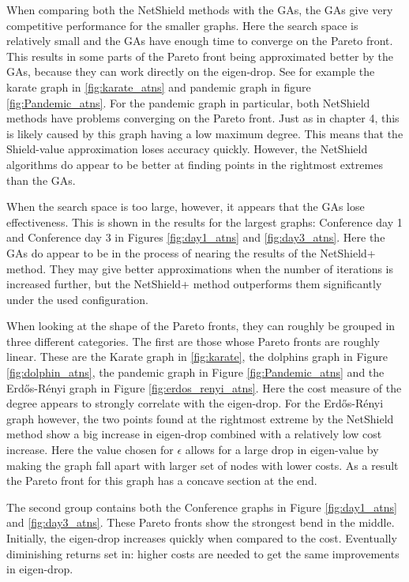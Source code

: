 \documentclass[11pt]{article}
\theoremstyle{definition}
\begin{document}
When comparing both the NetShield methods with the GAs, the GAs give very competitive performance for the smaller graphs. Here the search space is relatively small and the GAs have enough time to converge on the Pareto front. This results in some parts of the Pareto front being approximated better by the GAs, because they can work directly on the eigen-drop. See for example the karate graph in \ref{fig:karate_atns} and pandemic graph in figure \ref{fig:Pandemic_atns}. For the pandemic graph in particular, both NetShield methods have problems converging on the Pareto front. Just as in chapter 4, this is likely caused by this graph having a low maximum degree. This means that the Shield-value approximation loses accuracy quickly. However, the NetShield algorithms do appear to be better at finding points in the rightmost extremes than the GAs. 

When the search space is too large, however, it appears that the GAs lose effectiveness. This is shown in the results for the largest graphs: Conference day 1 and Conference day 3 in Figures \ref{fig:day1_atns} and \ref{fig:day3_atns}. Here the GAs do appear to be in the process of nearing the results of the NetShield+ method. They may give better approximations when the number of iterations is increased further, but the NetShield+ method outperforms them significantly under the used configuration.

When looking at the shape of the Pareto fronts, they can roughly be grouped in three different categories. The first are those whose Pareto fronts are roughly linear. These are the Karate graph in \ref{fig:karate}, the dolphins graph in Figure \ref{fig:dolphin_atns}, the pandemic graph in Figure  \ref{fig:Pandemic_atns} and the Erd\H{o}s-R\'enyi graph in Figure \ref{fig:erdos_renyi_atns}. Here the cost measure of the degree appears to strongly correlate with the eigen-drop. For the Erd\H{o}s-R\'enyi graph however, the two points found at the rightmost extreme by the NetShield method show a big increase in eigen-drop combined with a relatively low cost increase. Here the value chosen for $\epsilon$ allows for a large drop in eigen-value by making the graph fall apart with larger set of nodes with lower costs. As a result the Pareto front for this graph has a concave section at the end. 

The second group contains both the Conference graphs in Figure \ref{fig:day1_atns} and \ref{fig:day3_atns}. These Pareto fronts show the strongest bend in the middle. Initially, the eigen-drop increases quickly when compared to the cost. Eventually diminishing returns set in: higher costs are needed to get the same improvements in eigen-drop. 
\end{document}
